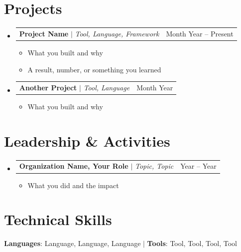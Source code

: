 \documentclass[letterpaper,11pt]{article}
\makeatletter
\newcommand{\resumeItem}[1]{
  \item\small{
    {#1 \vspace{-2pt}}
  }
}
\newcommand{\resumeProjectHeading}[2]{
    \item
    \begin{tabular*}{0.97\textwidth}{l@{\extracolsep{\fill}}r}
      \small#1 & #2 \\
    \end{tabular*}\vspace{-7pt}
}
\newcommand{\resumeSubHeadingListStart}{\begin{itemize}[leftmargin=0.15in, label={}]}
\newcommand{\resumeSubHeadingListEnd}{\end{itemize}}
\newcommand{\resumeItemListStart}{\begin{itemize}[label=$\bullet$]}
\newcommand{\resumeItemListEnd}{\end{itemize}\vspace{-5pt}}
\makeatother
\begin{document}
\section{Projects}
    \resumeSubHeadingListStart
      \resumeProjectHeading
          {\textbf{Project Name} $|$ \emph{Tool, Language, Framework}}{Month Year -- Present}
          \resumeItemListStart
            \resumeItem{What you built and why}
            \resumeItem{A result, number, or something you learned}
          \resumeItemListEnd
      \resumeProjectHeading
          {\textbf{Another Project} $|$ \emph{Tool, Language}}{Month Year}
          \resumeItemListStart
            \resumeItem{What you built and why}
          \resumeItemListEnd
    \resumeSubHeadingListEnd

\section{Leadership \& Activities}
  \resumeSubHeadingListStart
      \resumeProjectHeading
          {\textbf{Organization Name, Your Role} $|$ \emph{Topic, Topic}}{Year -- Year}
          \resumeItemListStart
            \resumeItem{What you did and the impact}
          \resumeItemListEnd
  \resumeSubHeadingListEnd

\section{Technical Skills}
 \begin{itemize}[leftmargin=0.15in, label={}]
    \small{\item{
     \textbf{Languages}{: Language, Language, Language} \quad $|$ \quad \textbf{Tools}{: Tool, Tool, Tool, Tool}
    }}
 \end{itemize}

\end{document}
